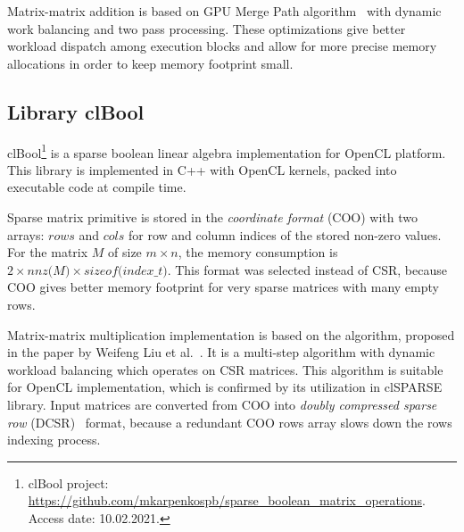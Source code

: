 Matrix-matrix addition is based on GPU Merge Path algorithm~\cite{inproceedings:gpu_merge_path} with dynamic work balancing and two pass processing.
These optimizations give better workload dispatch among execution blocks and allow for more precise memory allocations in order to keep memory footprint small.


\subsection{Library clBool}

clBool\footnote{clBool project: \url{https://github.com/mkarpenkospb/sparse_boolean_matrix_operations}. Access date: 10.02.2021.} 
is a sparse boolean linear algebra implementation for OpenCL platform.
This library is implemented in C++ with OpenCL kernels, packed into executable code at compile time. 

Sparse matrix primitive is stored in the \textit{coordinate format} (COO) with two arrays: $rows$ and $cols$ for row and column indices of the stored non-zero values.
For the matrix $M$ of size $m \times n$, the memory consumption is $2 \times \textit{nnz(M)} \times \textit{sizeof(index\_t)}$.
This format was selected instead of CSR, because COO gives better memory footprint for very sparse matrices with many empty rows.

Matrix-matrix multiplication implementation is based on the algorithm, proposed in the paper by Weifeng Liu et al.~\cite{DBLP:journals/corr/0002V15a:spframework}.
It is a multi-step algorithm with dynamic workload balancing which operates on CSR matrices.
This algorithm is suitable for OpenCL implementation, which is confirmed by its utilization in clSPARSE library.
Input matrices are converted from COO into \textit{doubly compressed sparse row} (DCSR)~\cite{4536313:about:dcsr} format,
because a redundant COO rows array slows down the rows indexing process. 

